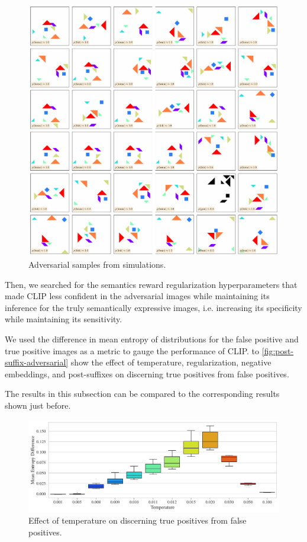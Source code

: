 \begin{figure}[h]
    \centering
    \includegraphics[width=\textwidth]{images/adversarial_samples.pdf}
    \caption{Adversarial samples from simulations.}
    \label{fig:semantic-bias-random}
\end{figure}

Then, we searched for the semantics reward regularization hyperparameters that made CLIP less confident in the adversarial images while maintaining its inference for the truly semantically expressive images, i.e. increasing its specificity while maintaining its sensitivity.

We used the difference in mean entropy of distributions for the false positive and true positive images as a metric to gauge the performance of CLIP.
 to \ref{fig:post-suffix-adversarial} show the effect of temperature, regularization, negative embeddings, and post-suffixes on discerning true positives from false positives.

The results in this subsection can be compared to the corresponding results shown just before.

\begin{figure}[H]
    \centering
    \includegraphics[width=\textwidth]{images/temperature_adversarial.pdf}
    \caption{Effect of temperature on discerning true positives from false positives.}
    \label{fig:clip-temperature-adversarial}
\end{figure}

